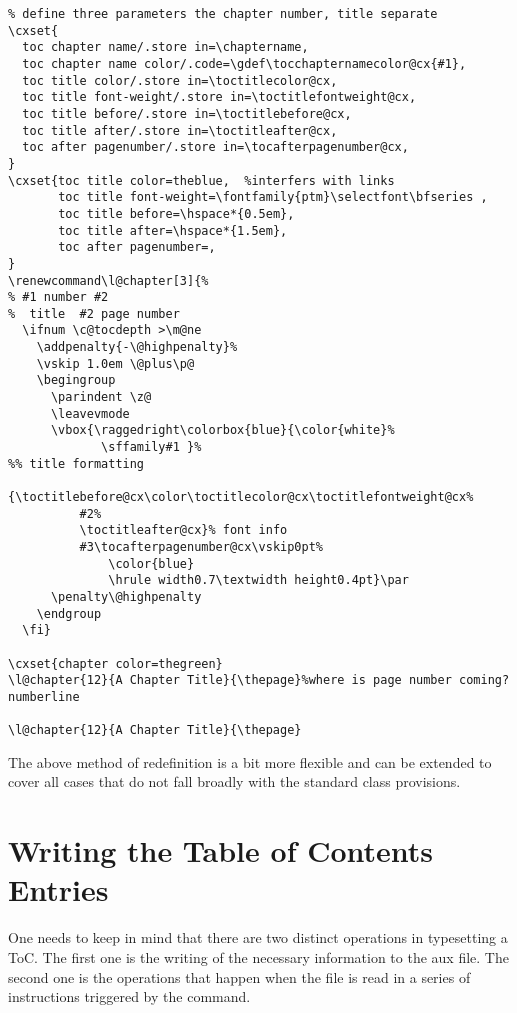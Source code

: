 \begin{lstlisting}
% define three parameters the chapter number, title separate
\cxset{
  toc chapter name/.store in=\chaptername,
  toc chapter name color/.code=\gdef\tocchapternamecolor@cx{#1},
  toc title color/.store in=\toctitlecolor@cx,
  toc title font-weight/.store in=\toctitlefontweight@cx,
  toc title before/.store in=\toctitlebefore@cx,
  toc title after/.store in=\toctitleafter@cx,
  toc after pagenumber/.store in=\tocafterpagenumber@cx,
}
\cxset{toc title color=theblue,  %interfers with links
       toc title font-weight=\fontfamily{ptm}\selectfont\bfseries ,
       toc title before=\hspace*{0.5em},
       toc title after=\hspace*{1.5em},
       toc after pagenumber=,
}
\renewcommand\l@chapter[3]{%
% #1 number #2
%  title  #2 page number
  \ifnum \c@tocdepth >\m@ne
    \addpenalty{-\@highpenalty}%
    \vskip 1.0em \@plus\p@
    \begingroup
      \parindent \z@
      \leavevmode
      \vbox{\raggedright\colorbox{blue}{\color{white}%
             \sffamily#1 }%
%% title formatting
        {\toctitlebefore@cx\color\toctitlecolor@cx\toctitlefontweight@cx%
          #2%
          \toctitleafter@cx}% font info
          #3\tocafterpagenumber@cx\vskip0pt%
              \color{blue}
              \hrule width0.7\textwidth height0.4pt}\par
      \penalty\@highpenalty
    \endgroup
  \fi}

\cxset{chapter color=thegreen}
\l@chapter{12}{A Chapter Title}{\thepage}%where is page number coming?numberline

\l@chapter{12}{A Chapter Title}{\thepage}
\end{lstlisting}


The above method of redefinition is a bit more flexible and can be extended to cover all cases that do not fall broadly with the standard class provisions.


\section{Writing the Table of Contents Entries}


One needs to keep in mind that there are two distinct operations in typesetting a ToC. The first one is the writing of the necessary information to the aux file. The second one is the operations that happen when the file is read in a series of instructions triggered by the  command.

